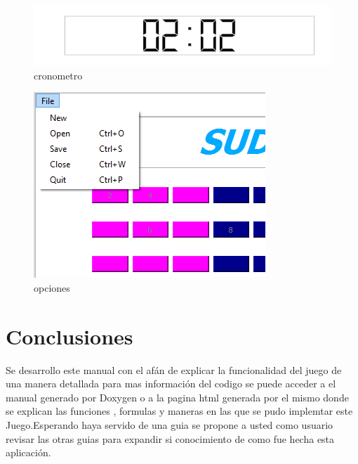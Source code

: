 \documentclass[12pt,oneside]{book}
\begin{document}
\begin{figure}
\begin{center}
\includegraphics[width=.60\textwidth]{./imagenes/cronometro.png}
\caption{cronometro}
\label{cronometro}
\end{center}
\end{figure}



\begin{figure}[htbp]
\begin{center}
\includegraphics[width=.60\textwidth]{./imagenes/opciones.png}
\caption{opciones}
\label{opciones}
\end{center}
\end{figure}



\chapter{Conclusiones}
Se desarrollo este manual con el afán de explicar la funcionalidad del juego de una manera detallada para mas información del codigo se puede acceder a el manual generado por Doxygen o a la pagina html generada por el mismo donde se explican las funciones , formulas y maneras en las que se pudo implemtar este Juego.Esperando haya servido de una guia se propone a usted como usuario revisar las otras guias para expandir si conocimiento de como fue hecha esta aplicación.
\end{document}
